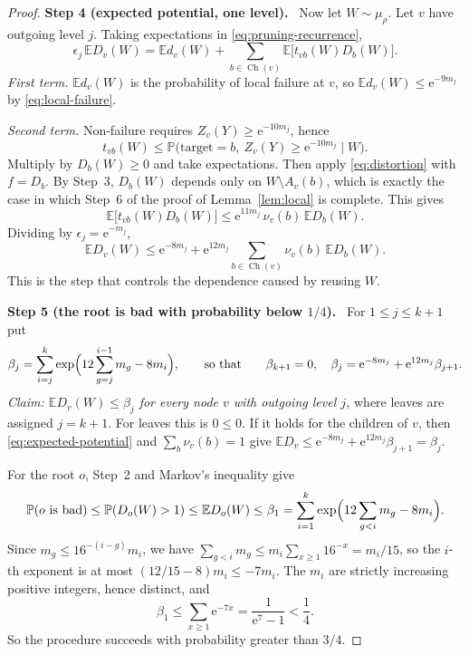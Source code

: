 \documentclass[11pt]{article}
\numberwithin{equation}{section}
\theoremstyle{remark}
\newcommand{\PP}{\mathbb P}
\newcommand{\EE}{\mathbb E}
\newcommand{\ch}{\operatorname{Ch}}
\newcommand{\ee}{\mathrm e}
\newcommand{\step}[1]{\par\medskip\noindent\textbf{#1}\ }
\begin{document}
\begin{proof}
\step{Step 4 (expected potential, one level).} Now let $W\sim\mu_\rho$.
Let $v$ have outgoing level $j$. Taking expectations in
\eqref{eq:pruning-recurrence},
\[
 \epsilon_j\,\EE D_v(W)=\EE d_v(W)+\sum_{b\in\ch(v)}\EE\bigl[t_{vb}(W)D_b(W)\bigr].
\]
\emph{First term.} $\EE d_v(W)$ is the probability of local failure at
$v$, so $\EE d_v(W)\le\ee^{-9m_j}$ by \eqref{eq:local-failure}.

\emph{Second term.} Non-failure requires $Z_v(Y)\ge\ee^{-10m_j}$, hence
\[
 t_{vb}(W)\le
 \PP\bigl(\mathrm{target}=b,\ Z_v(Y)\ge\ee^{-10m_j}\mid W\bigr).
\]
Multiply by $D_b(W)\ge0$ and take expectations. Then apply
\eqref{eq:distortion} with $f=D_b$. By Step~3, $D_b(W)$ depends only on
$W\setminus A_v(b)$, which is exactly the case in which Step~6 of the
proof of Lemma~\ref{lem:local} is complete. This gives
\[
 \EE\bigl[t_{vb}(W)D_b(W)\bigr]\le\ee^{11m_j}\,\nu_v(b)\,\EE D_b(W).
\]
Dividing by $\epsilon_j=\ee^{-m_j}$,
\begin{equation}\label{eq:expected-potential}
 \EE D_v(W)
 \le \ee^{-8m_j}
    +\ee^{12m_j}\sum_{b\in\ch(v)}\nu_v(b)\,\EE D_b(W).
\end{equation}
This is the step that controls the dependence caused by reusing $W$.

\step{Step 5 (the root is bad with probability below $1/4$).} For
$1\le j\le k+1$ put
\[
 \beta_j=\sum_{i=j}^k
 \exp\Bigl(12\sum_{g=j}^{i-1}m_g-8m_i\Bigr),
 \qquad\text{so that}\qquad
 \beta_{k+1}=0,\quad \beta_j=\ee^{-8m_j}+\ee^{12m_j}\beta_{j+1}.
\]
\emph{Claim: $\EE D_v(W)\le\beta_j$ for every node $v$ with outgoing
level $j$,} where leaves are assigned $j=k+1$. For leaves this is
$0\le0$. If it holds for the children of $v$, then
\eqref{eq:expected-potential} and $\sum_b\nu_v(b)=1$ give
$\EE D_v\le\ee^{-8m_j}+\ee^{12m_j}\beta_{j+1}=\beta_j$.

For the root $o$, Step~2 and Markov's inequality give
\[
 \PP(o\text{ is bad})\le\PP(D_o(W)>1)\le\EE D_o(W)\le\beta_1
 =\sum_{i=1}^k\exp\Bigl(12\sum_{g<i}m_g-8m_i\Bigr).
\]
Since $m_g\le16^{-(i-g)}m_i$, we have
$\sum_{g<i}m_g\le m_i\sum_{x\ge1}16^{-x}=m_i/15$, so the $i$-th exponent
is at most $(12/15-8)m_i\le-7m_i$. The $m_i$ are strictly increasing
positive integers, hence distinct, and
\[
 \beta_1\le\sum_{x\ge1}\ee^{-7x}=\frac1{\ee^{7}-1}<\frac14 .
\]
So the procedure succeeds with probability greater than $3/4$.


\end{proof}
\end{document}
